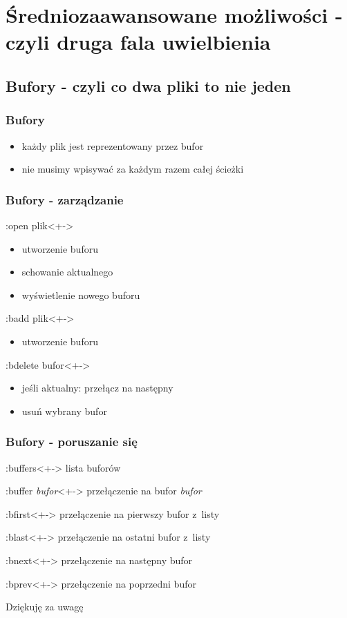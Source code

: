 \documentclass{beamer}
\begin{document}
\section{Średniozaawansowane możliwości - czyli druga fala uwielbienia}
\subsection{Bufory - czyli co dwa pliki to nie jeden}
\begin{frame}
	\frametitle{Bufory}
	\begin{itemize}[<+->]
		\item każdy plik jest reprezentowany przez bufor
		\item nie musimy wpisywać za każdym razem całej ścieżki
	\end{itemize}
\end{frame}
\begin{frame}
	\frametitle{Bufory - zarządzanie}
	\begin{block}{:open plik}<+->
		\begin{itemize}
			\item utworzenie buforu
			\item schowanie aktualnego
			\item wyświetlenie nowego buforu
		\end{itemize}
	\end{block}
	\begin{block}{:badd plik}<+->
		\begin{itemize}
			\item utworzenie buforu
		\end{itemize}
	\end{block}
	\begin{block}{:bdelete bufor}<+->
		\begin{itemize}
			\item jeśli aktualny: przełącz na następny
			\item usuń wybrany bufor
		\end{itemize}
	\end{block}
\end{frame}
\begin{frame}
	\frametitle{Bufory - poruszanie się}
	\begin{block}{:buffers}<+->
		lista buforów
	\end{block}
	\begin{block}{:buffer \textit{bufor}}<+->
		przełączenie na bufor \textit{bufor}
	\end{block}
	\begin{block}{:bfirst}<+->
		przełączenie na pierwszy bufor z~listy
	\end{block}
	\begin{block}{:blast}<+->
		przełączenie na ostatni bufor z~listy
	\end{block}
\end{frame}
\begin{frame}
	\begin{block}{:bnext}<+->
		przełączenie na następny bufor
	\end{block}
	\begin{block}{:bprev}<+->
		przełączenie na poprzedni bufor
	\end{block}
\end{frame}
\begin{frame}
	Dziękuję za uwagę
\end{frame}
\end{document}
